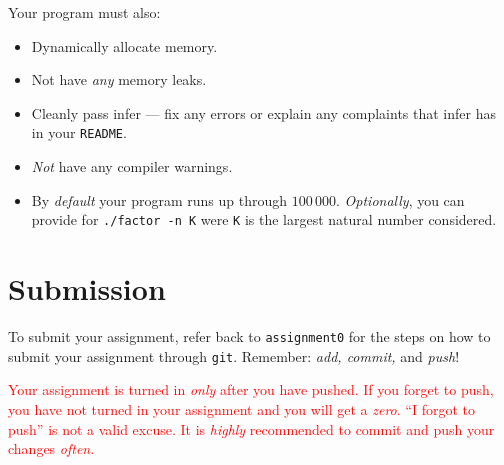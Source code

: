 \documentclass{article}
\begin{document}
\noindent Your program must also:
\begin{itemize}
  \item Dynamically allocate memory.
  \item Not have \emph{any} memory leaks.
  \item Cleanly pass infer --- fix any errors or explain any complaints that infer has in your \texttt{README}.
  \item \emph{Not} have any compiler warnings.
  \item By \emph{default} your program runs up through $100\,000$. \emph{Optionally}, you can provide for \texttt{./factor -n K} were \texttt{K} is the largest natural number considered.
\end{itemize}


\section{Submission}

To submit your assignment, refer back to \texttt{assignment0} for the steps on how to submit your assignment through \texttt{git}. Remember: \emph{add, commit,} and \emph{push}!

\textcolor{red}{Your assignment is turned in \emph{only} after you have pushed.
If you forget to push, you have not turned in your assignment and you will get
a \emph{zero}. ``I forgot to push'' is not a valid excuse. It is \emph{highly} recommended to commit and push your changes \emph{often}.}
\end{document}
